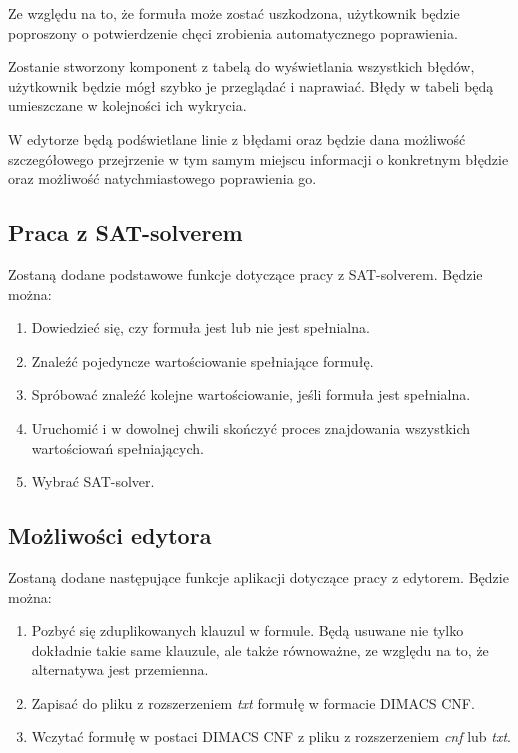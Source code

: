 \documentclass[a4paper,12pt]{book}
\theoremstyle{definition}
\begin{document}
\noindent Ze względu na to, że formuła może zostać uszkodzona, użytkownik będzie poproszony o potwierdzenie chęci zrobienia automatycznego poprawienia.

Zostanie stworzony komponent z tabelą do wyświetlania wszystkich błędów, użytkownik będzie mógł szybko je przeglądać i naprawiać. Błędy w tabeli będą umieszczane w kolejności ich wykrycia.

W edytorze będą podświetlane linie z błędami oraz będzie dana możliwość szczegółowego przejrzenie w tym samym miejscu informacji o konkretnym błędzie oraz możliwość natychmiastowego poprawienia go.

\subsection{Praca z SAT-solverem}

Zostaną dodane podstawowe funkcje dotyczące pracy z SAT-solverem. Będzie można:

\begin{enumerate}
    \item Dowiedzieć się, czy formuła jest lub nie jest spełnialna.
    \item Znaleźć pojedyncze wartościowanie spełniające formułę.
    \item Spróbować znaleźć kolejne wartościowanie, jeśli formuła jest spełnialna.
    \item Uruchomić i w dowolnej chwili skończyć proces znajdowania wszystkich wartościowań spełniających.
    \item Wybrać SAT-solver.
\end{enumerate}

\subsection{Możliwości edytora}

Zostaną dodane następujące funkcje aplikacji dotyczące pracy z edytorem. Będzie można:

\begin{enumerate}
    \item Pozbyć się zduplikowanych klauzul w formule. Będą usuwane nie tylko dokładnie takie same klauzule, ale także równoważne, ze względu na to, że alternatywa jest przemienna.
    \item Zapisać do pliku z rozszerzeniem \textit{txt} formułę w formacie DIMACS CNF.
    \item Wczytać formułę w postaci DIMACS CNF z pliku z rozszerzeniem \textit{cnf} lub \textit{txt}. 
\end{enumerate}
\end{document}
